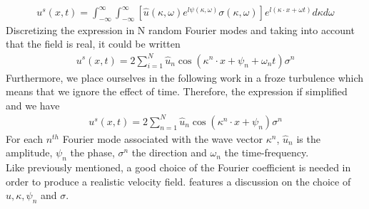\documentclass[a4paper,12pt]{article}
\theoremstyle{definition}
\begin{document}
\begin{align}
    u^s(x,t)=\int_{-\infty}^\infty\int_{-\infty}^{\infty}\left[ \hat{u}(\kappa,\omega)e^{l\psi(\kappa,\omega)}\sigma(\kappa,\omega) \right] e^{l(\kappa\cdot x + \omega t)} d\kappa d\omega
\end{align}
Discretizing the expression in N random Fourier modes and taking into account that the field is real, it could be written 
\begin{align}
    u^s(x,t)= 2 \sum_{i=1}^N \hat{u}_n \cos(\kappa^n\cdot x + \psi_n + \omega_n t)\sigma^n
\end{align}
Furthermore, we place ourselves in the following work in a froze turbulence which means that we ignore the effect of time. Therefore, the expression if simplified and we have
\begin{align}
    u^s(x,t)= 2 \sum_{n=1}^N \hat{u}_n \cos(\kappa^n\cdot x + \psi_n)\sigma^n
    \label{RandomFourierModel}
\end{align}
For each $n^{th}$ Fourier mode associated with the wave vector $\kappa^n$, $\hat{u}_n$ is the amplitude, $\psi_n$ the phase, $\sigma^n$ the direction and $\omega_n$ the time-frequency. \\
Like previously mentioned, a good choice of the Fourier coefficient is needed in order to produce a realistic velocity field. \cite{Janin2021} features a discussion on the choice of $\hat{u}, \kappa, \psi_n$ and $\sigma$.
\end{document}
